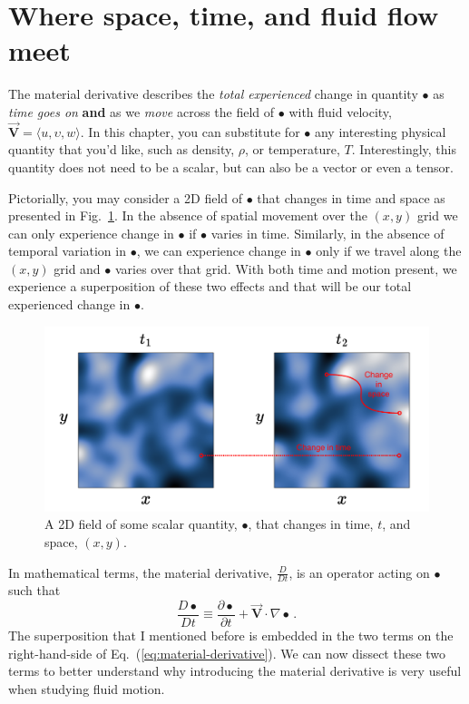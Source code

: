\section{Where space, time, and fluid flow meet}

The material derivative describes the \textit{total experienced} change in quantity $\bullet$ as \textit{time goes on} \textbf{and} as we \textit{move} across the field of $\bullet$ with fluid velocity, $\vec{\bm{V}} = \langle u, \upsilon, w \rangle$.
In this chapter, you can substitute for $\bullet$ any interesting physical quantity that you'd like, such as density, $\rho$, or temperature, $T$. Interestingly, this quantity does not need to be a scalar, but can also be a vector or even a tensor.

Pictorially, you may consider a 2D field of $\bullet$ that changes in time and space as presented in Fig.~\ref{fig:material-derivative-example}. In the absence of spatial movement over the $(x,y)$ grid we can only experience change in $\bullet$ if $\bullet$ varies in time. Similarly, in the absence of temporal variation in $\bullet$, we can experience change in $\bullet$ only if we travel along the $(x,y)$ grid and $\bullet$ varies over that grid. With both time and motion present, we experience a superposition of these two effects and that will be our total experienced change in $\bullet$.
\begin{figure}[H]
\centering\includegraphics[width=15cm]{material-derivative.pdf}
\caption{A 2D field of some scalar quantity, $\bullet$, that changes in time, $t$, and space, $(x, y)$.}			
\label{fig:material-derivative-example}
\end{figure}

In mathematical terms, the material derivative, $\frac{D}{Dt}$, is an operator acting on $\bullet$ such that
\begin{equation} \label{eq:material-derivative}
\frac{D \bullet}{D t} \equiv \frac{\partial \bullet}{\partial t} + \vec{\bm{V}} \cdot \nabla \bullet \, .
\end{equation}
The superposition that I mentioned before is embedded in the two terms on the right-hand-side of Eq.~(\ref{eq:material-derivative}). We can now dissect these two terms to better understand why introducing the material derivative is very useful when studying fluid motion.


